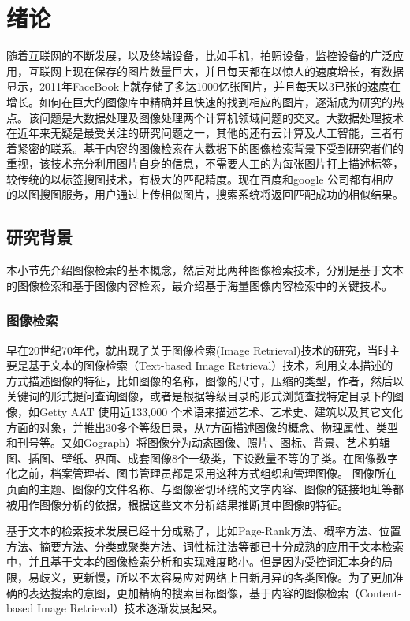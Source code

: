 ﻿\chapter{绪论}

随着互联网的不断发展，以及终端设备，比如手机，拍照设备，监控设备的广泛应用，互联网上现在保存的图片数量巨大，并且每天都在以惊人的速度增长，有数据显示，2011年FaceBook上就存储了多达1000亿张图片，并且每天以3已张的速度在增长。如何在巨大的图像库中精确并且快速的找到相应的图片，逐渐成为研究的热点。该问题是大数据处理及图像处理两个计算机领域问题的交叉。大数据处理技术在近年来无疑是最受关注的研究问题之一，其他的还有云计算及人工智能，三者有着紧密的联系。基于内容的图像检索在大数据下的图像检索背景下受到研究者们的重视，该技术充分利用图片自身的信息，不需要人工的为每张图片打上描述标签，较传统的以标签搜图技术，有极大的匹配精度。现在百度和google 公司都有相应的以图搜图服务，用户通过上传相似图片，搜索系统将返回匹配成功的相似结果。

\section{研究背景}
本小节先介绍图像检索的基本概念，然后对比两种图像检索技术，分别是基于文本的图像检索和基于图像内容检索，最介绍基于海量图像内容检索中的关键技术。

\subsection{图像检索}
早在20世纪70年代，就出现了关于图像检索(Image Retrieval)技术的研究，当时主要是基于文本的图像检索（Text-based Image Retrieval）技术，利用文本描述的方式描述图像的特征，比如图像的名称，图像的尺寸，压缩的类型，作者，然后以关键词的形式提问查询图像，或者是根据等级目录的形式浏览查找特定目录下的图像，如Getty AAT 使用近133,000 个术语来描述艺术、艺术史、建筑以及其它文化方面的对象，并推出30多个等级目录，从7方面描述图像的概念、物理属性、类型和刊号等。又如Gograph）将图像分为动态图像、照片、图标、背景、艺术剪辑图、插图、壁纸、界面、成套图像8个一级类，下设数量不等的子类。在图像数字化之前，档案管理者、图书管理员都是采用这种方式组织和管理图像。 图像所在页面的主题、图像的文件名称、与图像密切环绕的文字内容、图像的链接地址等都被用作图像分析的依据，根据这些文本分析结果推断其中图像的特征。

基于文本的检索技术发展已经十分成熟了，比如Page-Rank方法、概率方法、位置方法、摘要方法、分类或聚类方法、词性标注法等都已十分成熟的应用于文本检索中，并且基于文本的图像检索分析和实现难度略小。但是因为受控词汇本身的局限，易歧义，更新慢，所以不太容易应对网络上日新月异的各类图像。为了更加准确的表达搜索的意图，更加精确的搜索目标图像，基于内容的图像检索（Content-based Image Retrieval）技术逐渐发展起来。

